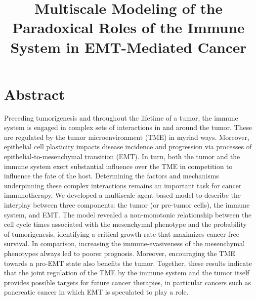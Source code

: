 \documentclass[11pt, a4paper, preprint]{article}
\title{Multiscale Modeling of the Paradoxical Roles of the Immune System in EMT-Mediated Cancer}
\author{}
\newcommand{\tcr} { \textcolor{red} }
\begin{document}
\maketitle


\section*{Abstract}
Preceding tumorigenesis and throughout the lifetime of a tumor, the immune system is engaged in complex sets of interactions in and around the tumor.
These are regulated by the tumor microenvironment (TME) in myriad ways. Moreover,  epithelial cell plasticity impacts disease incidence and progression via processes of epithelial-to-mesenchymal transition (EMT).
In turn, both the tumor and the immune system exert substantial influence over the TME in competition to influence the fate of the host.
Determining the factors and mechanisms underpinning these complex interactions remains an important task for cancer immunotherapy.
We developed a multiscale agent-based model to describe the interplay between three components: the tumor (or pre-tumor cells), the immune system, and EMT.
The model revealed a non-monotonic relationship between the cell cycle times associated with the mesenchymal phenotype and the probability of tumorigenesis, identifying a critical growth rate that maximizes cancer-free survival. In comparison, increasing the immune-evasiveness of the mesenchymal phenotypes always led to poorer prognosis. Moreover, encouraging
the TME
towards a pro-EMT state also benefits the tumor.
Together, these results indicate that the joint regulation of the TME by the immune system and the tumor itself provides possible targets for future cancer therapies, in particular cancers such as pancreatic cancer in which EMT is speculated to play a role.

\end{document}
